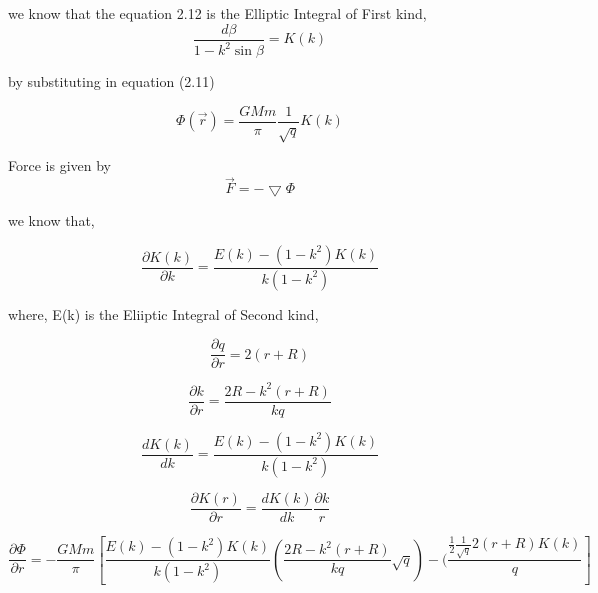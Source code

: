 \begin{center}
we know that the equation 2.12 is the Elliptic Integral of First kind,
\begin{equation}
\frac{d \beta } {1 - k^2 \sin \beta } = K (k) 
\end{equation}
 
by substituting in equation (2.11)

\begin{equation}
 \Phi (\vec{r}) = \frac{GMm}{ \pi} \frac{1}{\sqrt{q}} K (k) 
\end{equation}

Force is given by
\begin{equation}
 \vec{F} = - \bigtriangledown  \Phi 
\end{equation}
\end{center}

we know that,
\begin{center}

\begin{equation}
\frac{\partial K (k)}{\partial k } = \frac{E(k)- (1-k^2) K(k)}{k(1- k^2)} 
\end{equation}
\end{center}
where, E(k) is the Eliiptic Integral of Second kind,

\begin{center}

\begin{equation}
 \frac{\partial q}{\partial r} = 2 (r + R)
\end{equation}

\begin{equation}
 \frac{\partial k}{\partial r} = \frac{2R - k^2 (r + R)}{kq} 
\end{equation}

\begin{equation}
\frac{d K(k)}{d k} = \frac{E(k) - (1-k^2) K(k)}{k (1-k^2)} 
\end{equation}

\begin{equation}
\frac{\partial K (r)}{\partial r} = \frac{d K(k)}{dk} \frac{\partial k }{r} 
\end{equation}

\begin{equation}
\frac{\partial \Phi}{\partial r} = - \frac{GMm }{\pi} [ \frac{E(k) - (1-k^2) K(k)}{k (1-k^2)} (\frac{2R - k^2 (r + R)}{kq} \sqrt{q}) - (\frac{\frac{1}{2} \frac{1}{\sqrt{q}}2 (r + R ) K(k)} {q}] 
\end{equation}

\end{center}

